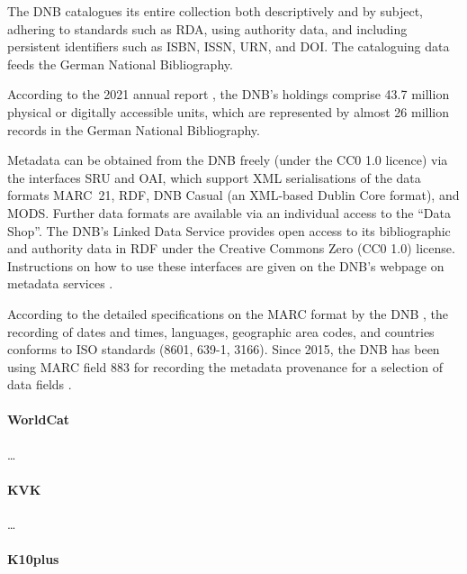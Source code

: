 The DNB catalogues its entire collection both descriptively and by subject, 
adhering to standards such as \gls{RDA}, using authority data, and including persistent identifiers such as ISBN, ISSN, URN, and DOI.
The cataloguing data feeds the German National Bibliography.

According to the 2021 annual report \autocite{DNB_Jahresbericht_2021},
the DNB's holdings comprise 43.7 million physical or digitally accessible units, 
which are represented by almost 26 million records in the German National Bibliography.

Metadata can be obtained from the DNB freely (under the CC0 1.0 licence) via the interfaces
\gls{SRU} and \gls{OAI}, which support XML serialisations of the data formats
MARC~21, \gls{RDF}, DNB Casual (an XML-based Dublin Core format), and MODS.
Further data formats are available via an individual access
to the \enquote{Data Shop}.
The DNB's Linked Data Service provides open access to its bibliographic and authority data
in RDF under the Creative Commons Zero (CC0 1.0) license. Instructions on how to use these interfaces
are given on the DNB's webpage on metadata services \autocite{DNB_metadata}.

According to the detailed specifications on the MARC format by the DNB
\autocite{DNB_MARC21,DNB_MARCXML}, the recording of dates and times, languages,
geographic area codes, and countries conforms to ISO standards (8601, 639-1, 3166).
Since 2015, the DNB has been using MARC field 883
for recording the metadata provenance for a selection of data fields
\autocite{DNBwiki_MARC_883}.



\paragraph{WorldCat}

\dots

\paragraph{KVK}

\dots

\paragraph{K10plus}

